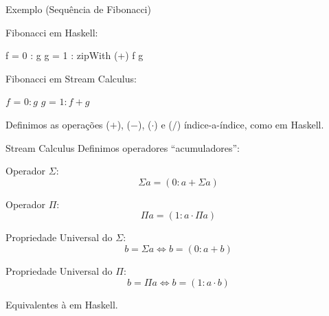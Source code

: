 
\begin{frame}[fragile]{Exemplo (Sequência de Fibonacci)}
  \begin{minipage}[t]{0.45\textwidth}
    Fibonacci em Haskell:
    \vspace{0.2cm}
      \begin{code}
f = 0 : g
g = 1 : zipWith (+) f g
  \end{code}
  \end{minipage}
  \pause
  \hfill
  \vrule
  \hfill
  \begin{minipage}[t]{0.50\textwidth}
    Fibonacci em Stream Calculus:
    \vspace{0.2cm}
    \begin{code}
$f$ = $0 : g$
$g$ = $1 : f + g$
    \end{code}
  \end{minipage}
  \vfill
  \pause
  Definimos as operações ($+$), ($-$), ($\cdot$) e ($/$) índice-a-índice, como  em Haskell.
\end{frame}

\begin{frame}[fragile]{Stream Calculus}
  Definimos operadores ``acumuladores'':
  \vfill
  \pause
  \begin{minipage}[t]{0.45\textwidth}
    Operador $\Sigma$:
    \vspace{0.1cm}
      \[\Sigma a = (0 : a + \Sigma a)\]
  \end{minipage}
  \pause
  \hfill
  \vrule
  \hfill
  \begin{minipage}[t]{0.50\textwidth}
    Operador $\Pi$:
    \vspace{0.1cm}
    \[\Pi a = (1 : a \cdot \Pi a)\]
  \end{minipage}
  \vfill
  \pause
  \begin{minipage}[t]{0.45\textwidth}
    Propriedade Universal do $\Sigma$:
    \vspace{0.1cm}
      \[b = \Sigma a \iff b = (0 : a + b)\]
  \end{minipage}
  \pause
  \hfill
  \vrule
  \hfill
  \begin{minipage}[t]{0.50\textwidth}
    Propriedade Universal do $\Pi$:
    \vspace{0.1cm}
    \[b = \Pi a \iff  b = (1 : a \cdot b)\]
  \end{minipage}
  \vfill
  \pause
  \begin{center}
    Equivalentes à  em Haskell.
  \end{center}
\end{frame}